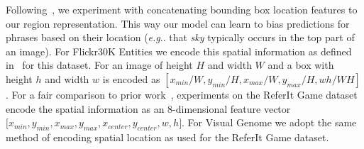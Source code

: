 \documentclass[runningheads]{llncs}
\makeatletter
\DeclareRobustCommand\onedot{\futurelet\@let@token\@onedot}
\def\@onedot{\ifx\@let@token.\else.\null\fi\xspace}
\def\eg{\emph{e.g}\onedot} \def\Eg{\emph{E.g}\onedot}
\makeatother
\begin{document}
\smallskip{} Following~\cite{rohrbach2015,ChenICMR2017,ChenICCV2017,yu2016context}, we experiment with concatenating bounding box location features to our region representation.  This way our model can learn to bias predictions for phrases based on their location (\eg that \emph{sky} typically occurs in the top part of an image).  For Flickr30K Entities we encode this spatial information as defined in~\cite{ChenICMR2017,ChenICCV2017} for this dataset.  For an image of height $H$ and width $W$ and a box with height $h$ and width $w$ is encoded as $[x_{min}/W, y_{min}/H, x_{max}/W, y_{max}/H, wh/WH]$. For a fair comparison to prior work~\cite{rohrbach2015,ChenICMR2017,ChenICCV2017},  experiments on the ReferIt Game dataset encode the spatial information as an 8-dimensional feature vector $[x_{min}, y_{min}, x_{max}, y_{max}, x_{center},$$ y_{center}, w, h]$.  For Visual Genome we adopt the same method of encoding spatial location as used for the ReferIt Game dataset.
\end{document}
